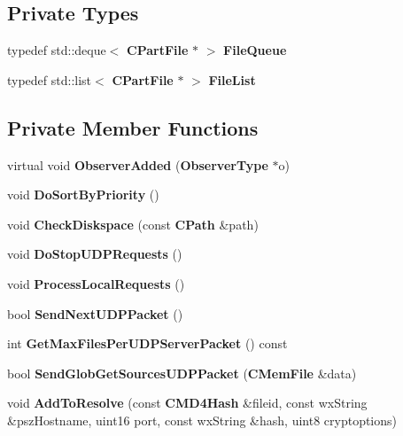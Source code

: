 \subsection*{Private Types}
\begin{DoxyCompactItemize}
\item 
typedef std::deque$<$ {\bf CPartFile} $\ast$ $>$ {\bfseries FileQueue}\label{classCDownloadQueue_ab1e133d165eebf05dbac45723d55d645}

\item 
typedef std::list$<$ {\bf CPartFile} $\ast$ $>$ {\bfseries FileList}\label{classCDownloadQueue_a8f4e19d9b060b6d0b9a7fb271243d1ce}

\end{DoxyCompactItemize}
\subsection*{Private Member Functions}
\begin{DoxyCompactItemize}
\item 
virtual void {\bf ObserverAdded} ({\bf ObserverType} $\ast$o)\label{classCDownloadQueue_a72c94d8e90868ec08d83a79c00aa0ab9}

\item 
void {\bf DoSortByPriority} ()\label{classCDownloadQueue_a2d77d536e249056f22e38dca197af8a1}

\item 
void {\bf CheckDiskspace} (const {\bf CPath} \&path)
\item 
void {\bf DoStopUDPRequests} ()\label{classCDownloadQueue_a432abdd07e9e1cd352775426f8a8b5f4}

\item 
void {\bfseries ProcessLocalRequests} ()\label{classCDownloadQueue_afb648acfb20fe680d764db0c9fec61a1}

\item 
bool {\bfseries SendNextUDPPacket} ()\label{classCDownloadQueue_a539923aac2e697f2e00968d1debf94d4}

\item 
int {\bfseries GetMaxFilesPerUDPServerPacket} () const \label{classCDownloadQueue_a4b02fc8d81229a932be9c414869012f9}

\item 
bool {\bfseries SendGlobGetSourcesUDPPacket} ({\bf CMemFile} \&data)\label{classCDownloadQueue_a9e13a0d5550d00ec719c49b6b69758ee}

\item 
void {\bfseries AddToResolve} (const {\bf CMD4Hash} \&fileid, const wxString \&pszHostname, uint16 port, const wxString \&hash, uint8 cryptoptions)\label{classCDownloadQueue_a25b2a3d00bb3a1bf5f528d198c76b740}

\end{DoxyCompactItemize}
